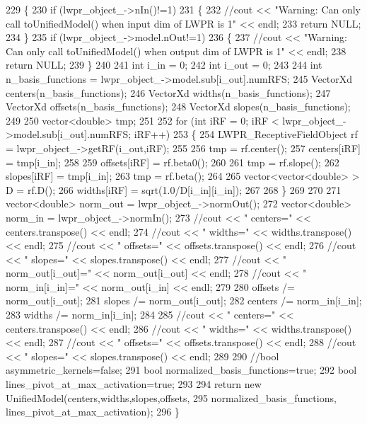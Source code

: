 \begin{DoxyCode}
229 \{
230   \textcolor{keywordflow}{if} (lwpr\_object\_->nIn()!=1)
231   \{
232     \textcolor{comment}{//cout << "Warning: Can only call toUnifiedModel() when input dim of LWPR is 1" << endl;}
233     \textcolor{keywordflow}{return} NULL;
234   \}
235   \textcolor{keywordflow}{if} (lwpr\_object\_->model.nOut!=1)
236   \{
237     \textcolor{comment}{//cout << "Warning: Can only call toUnifiedModel() when output dim of LWPR is 1" << endl;}
238     \textcolor{keywordflow}{return} NULL;
239   \}
240   
241   \textcolor{keywordtype}{int} i\_in = 0;
242   \textcolor{keywordtype}{int} i\_out = 0;
243 
244   \textcolor{keywordtype}{int} n\_basis\_functions = lwpr\_object\_->model.sub[i\_out].numRFS;
245   VectorXd centers(n\_basis\_functions);
246   VectorXd widths(n\_basis\_functions);
247   VectorXd offsets(n\_basis\_functions);
248   VectorXd slopes(n\_basis\_functions);
249   
250   vector<double> tmp;
251   
252   \textcolor{keywordflow}{for} (\textcolor{keywordtype}{int} iRF = 0; iRF < lwpr\_object\_->model.sub[i\_out].numRFS; iRF++)
253   \{
254     LWPR\_ReceptiveFieldObject rf = lwpr\_object\_->getRF(i\_out,iRF);
255     
256     tmp = rf.center();
257     centers[iRF] = tmp[i\_in];
258     
259     offsets[iRF] = rf.beta0();
260     
261     tmp = rf.slope();
262     slopes[iRF] = tmp[i\_in];
263     tmp = rf.beta();
264 
265     vector<vector<double> > D = rf.D();
266     widths[iRF] = sqrt(1.0/D[i\_in][i\_in]);
267     
268   \}
269 
270   
271   vector<double> norm\_out = lwpr\_object\_->normOut();
272   vector<double> norm\_in = lwpr\_object\_->normIn();
273   \textcolor{comment}{//cout << "  centers=" << centers.transpose() << endl;}
274   \textcolor{comment}{//cout << "  widths=" << widths.transpose() << endl;}
275   \textcolor{comment}{//cout << "  offsets=" << offsets.transpose() << endl;}
276   \textcolor{comment}{//cout << "  slopes=" << slopes.transpose() << endl;}
277   \textcolor{comment}{//cout << "  norm\_out[i\_out]=" << norm\_out[i\_out] << endl;}
278   \textcolor{comment}{//cout << "  norm\_in[i\_in]=" << norm\_out[i\_in] << endl;}
279 
280   offsets /= norm\_out[i\_out];
281   slopes /= norm\_out[i\_out];
282   centers /= norm\_in[i\_in];
283   widths /= norm\_in[i\_in];
284   
285   \textcolor{comment}{//cout << "  centers=" << centers.transpose() << endl;}
286   \textcolor{comment}{//cout << "  widths=" << widths.transpose() << endl;}
287   \textcolor{comment}{//cout << "  offsets=" << offsets.transpose() << endl;}
288   \textcolor{comment}{//cout << "  slopes=" << slopes.transpose() << endl;}
289 
290   \textcolor{comment}{//bool asymmetric\_kernels=false;}
291   \textcolor{keywordtype}{bool} normalized\_basis\_functions=\textcolor{keyword}{true};
292   \textcolor{keywordtype}{bool} lines\_pivot\_at\_max\_activation=\textcolor{keyword}{true};
293 
294   \textcolor{keywordflow}{return} \textcolor{keyword}{new} UnifiedModel(centers,widths,slopes,offsets,
295                                     normalized\_basis\_functions, lines\_pivot\_at\_max\_activation);
296 \}
\end{DoxyCode}
